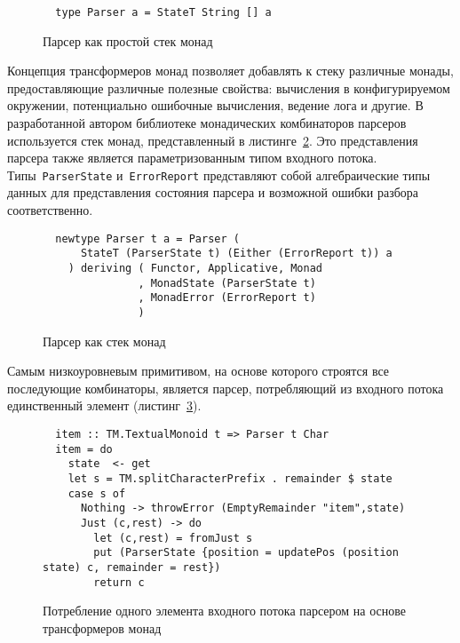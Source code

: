   \begin{figure}[h]
  \begin{lstlisting}
  type Parser a = StateT String [] a
  \end{lstlisting}
  \caption{Парсер как простой стек монад}
  \label{listing:monadStackParserType}
  \end{figure}

  Концепция трансформеров монад позволяет добавлять к стеку различные монады,
  предоставляющие различные полезные свойства: вычисления в конфигурируемом окружении,
  потенциально ошибочные вычисления, ведение лога и другие. В разработанной автором
  библиотеке монадических комбинаторов парсеров~\cite{mdParse} используется
  стек монад, представленный в листинге~\ref{listing:hugeMonadStackParserType}. Это
  представления парсера также является параметризованным типом входного потока.
  Типы~\lstinline{ParserState} и~\lstinline{ErrorReport} представляют собой
  алгебраические типы данных для представления состояния парсера и возможной
  ошибки разбора соответственно.

  \begin{figure}[h]
  \begin{lstlisting}
  newtype Parser t a = Parser (
      StateT (ParserState t) (Either (ErrorReport t)) a
    ) deriving ( Functor, Applicative, Monad
               , MonadState (ParserState t)
               , MonadError (ErrorReport t)
               )
  \end{lstlisting}
  \caption{Парсер как стек монад}
  \label{listing:hugeMonadStackParserType}
  \end{figure}

  Самым низкоуровневым примитивом, на основе которого строятся все последующие
  комбинаторы, является парсер, потребляющий из входного потока единственный элемент
  (листинг~\ref{listing:mtlParsersItem}).

  \begin{figure}[h]
  \begin{lstlisting}
  item :: TM.TextualMonoid t => Parser t Char
  item = do
    state  <- get
    let s = TM.splitCharacterPrefix . remainder $ state
    case s of
      Nothing -> throwError (EmptyRemainder "item",state)
      Just (c,rest) -> do
        let (c,rest) = fromJust s
        put (ParserState {position = updatePos (position state) c, remainder = rest})
        return c
  \end{lstlisting}
  \caption{Потребление одного элемента входного потока парсером на основе трансформеров
  монад}
  \label{listing:mtlParsersItem}
  \end{figure}

